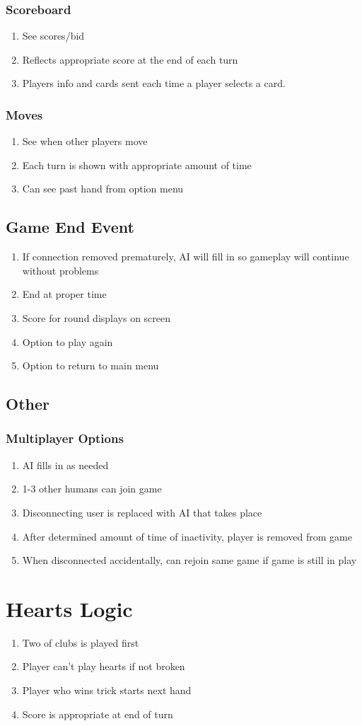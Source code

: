 \documentclass[11pt, titlepage]{article}
\begin{document}
\subsubsection{Scoreboard}
	\begin{enumerate}
		\item See scores/bid
		\item Reflects appropriate score at the end of each turn
		\item Players info and cards sent each time a player selects a card.
	\end{enumerate}


\subsubsection{Moves}
	\begin{enumerate}
		\item  See when other players move
		\item  Each turn is shown with appropriate amount of time
		\item  Can see past hand from option menu
	\end{enumerate}

\subsection{Game End Event}
	\begin{enumerate}
		\item If connection removed prematurely, AI will fill in so gameplay will continue without problems
		\item End at proper time
		\item Score for round displays on screen
		\item Option to play again
		\item Option to return to main menu
	\end{enumerate}

\subsection{Other}
	\subsubsection{Multiplayer Options}
		\begin{enumerate}
			\item AI fills in as needed
			\item 1-3 other humans can join game
			\item Disconnecting user is replaced with AI that takes place
			\item After determined amount of time of inactivity, player is removed from game
			\item When disconnected accidentally, can rejoin same game if game is still in play
		\end{enumerate}

\section{Hearts Logic}
	\begin{enumerate}
		\item Two of clubs is played first
		\item Player can't play hearts if not broken
		\item Player who wins trick starts next hand
		\item Score is appropriate at end of turn
	\end{enumerate}
\end{document}
